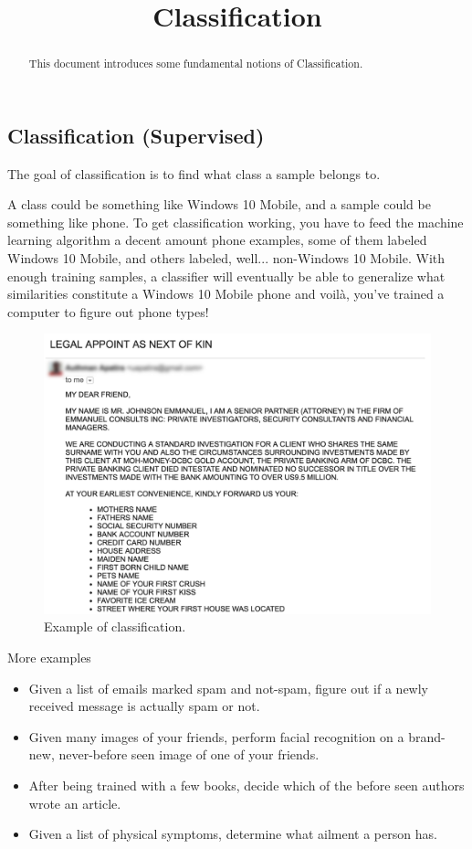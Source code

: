 \documentclass{article}
\begin{document}
\title{Classification}

\maketitle

\begin{abstract}
This document introduces some fundamental notions of Classification.
\end{abstract}

\subsection{Classification (Supervised)}
\par The goal of classification is to find what class a sample belongs to.

A class could be something like Windows 10 Mobile, and a sample could be something like phone. To get classification working, you have to feed the machine learning algorithm a decent amount phone examples, some of them labeled Windows 10 Mobile, and others labeled, well... non-Windows 10 Mobile. With enough training samples, a classifier will eventually be able to generalize what similarities constitute a Windows 10 Mobile phone and voilà, you've trained a computer to figure out phone types!

\begin{figure}[H]
\centering
\includegraphics[width=0.8\linewidth]{pic/classification.png}
\caption{Example of classification.}
\end{figure}

More examples

\begin{itemize}
    \item Given a list of emails marked spam and not-spam, figure out if a newly received message is actually spam or not.
    \item Given many images of your friends, perform facial recognition on a brand-new, never-before seen image of one of your friends.
    \item After being trained with a few books, decide which of the before seen authors wrote an article.
    \item Given a list of physical symptoms, determine what ailment a person has.
\end{itemize}
\end{document}
